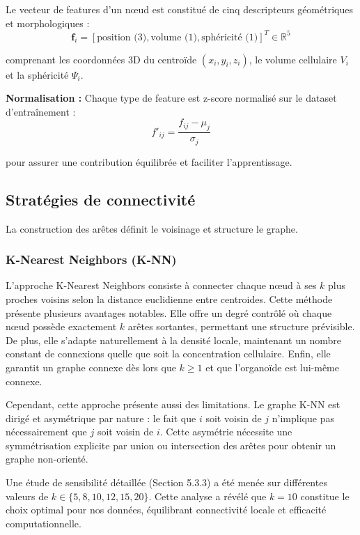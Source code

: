 Le vecteur de features d'un nœud est constitué de cinq descripteurs géométriques et morphologiques :
\[
\mathbf{f}_i = [\text{position (3)}, \text{volume (1)}, \text{sphéricité (1)}]^T \in \mathbb{R}^{5}
\]

comprenant les coordonnées 3D du centroïde $(x_i, y_i, z_i)$, le volume cellulaire $V_i$ et la sphéricité $\Psi_i$.

\textbf{Normalisation :}
Chaque type de feature est z-score normalisé sur le dataset d'entraînement :
\[
f'_{ij} = \frac{f_{ij} - \mu_j}{\sigma_j}
\]

pour assurer une contribution équilibrée et faciliter l'apprentissage.

\subsection{Stratégies de connectivité}

La construction des arêtes définit le voisinage et structure le graphe.

\subsubsection{K-Nearest Neighbors (K-NN)}

L'approche K-Nearest Neighbors consiste à connecter chaque nœud à ses $k$ plus proches voisins selon la distance euclidienne entre centroides. Cette méthode présente plusieurs avantages notables. Elle offre un degré contrôlé où chaque nœud possède exactement $k$ arêtes sortantes, permettant une structure prévisible. De plus, elle s'adapte naturellement à la densité locale, maintenant un nombre constant de connexions quelle que soit la concentration cellulaire. Enfin, elle garantit un graphe connexe dès lors que $k \geq 1$ et que l'organoïde est lui-même connexe.

Cependant, cette approche présente aussi des limitations. Le graphe K-NN est dirigé et asymétrique par nature : le fait que $i$ soit voisin de $j$ n'implique pas nécessairement que $j$ soit voisin de $i$. Cette asymétrie nécessite une symmétrisation explicite par union ou intersection des arêtes pour obtenir un graphe non-orienté.

Une étude de sensibilité détaillée (Section 5.3.3) a été menée sur différentes valeurs de $k \in \{5, 8, 10, 12, 15, 20\}$. Cette analyse a révélé que $k = 10$ constitue le choix optimal pour nos données, équilibrant connectivité locale et efficacité computationnelle.

